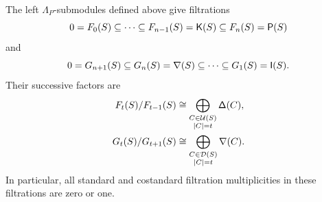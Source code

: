 \begin{proposition}
\label{prop:projective-injective-cardinality-filtrations}
The left $\Lambda_P$-submodules defined above give filtrations
\begin{equation}
0=F_0(S)\subseteq\cdots\subseteq F_{n-1}(S)=\mathsf K(S)
\subseteq F_n(S)=\mathsf P(S)
\label{eq:projective-cardinality-filtration-sequence}
\end{equation}
and
\begin{equation}
0=G_{n+1}(S)\subseteq G_n(S)=\mathsf\nabla(S)
\subseteq\cdots\subseteq G_1(S)=\mathsf I(S).
\label{eq:injective-cardinality-filtration-sequence}
\end{equation}
Their successive factors are
\begin{align}
F_t(S)/F_{t-1}(S)
&\cong
\bigoplus_{\substack{C\in\mathcal U(S)\\ |C|=t}}\mathsf\Delta(C),
\label{eq:projective-standard-factors}\\
G_t(S)/G_{t+1}(S)
&\cong
\bigoplus_{\substack{C\in\mathcal D(S)\\ |C|=t}}\mathsf\nabla(C).
\label{eq:injective-costandard-factors}
\end{align}
In particular, all standard and costandard filtration multiplicities in
these filtrations are zero or one.
\end{proposition}

